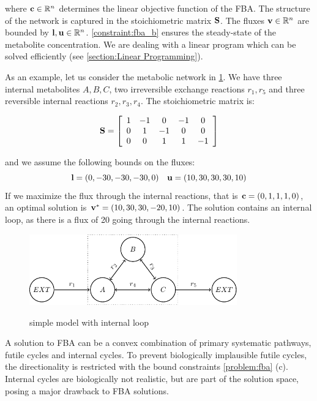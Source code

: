 where $\bold c \in \mathbb{R}^n$ determines the linear objective function of the FBA. The structure of the network is captured in the stoichiometric matrix $\bold S$. The fluxes $\bold v \in \mathbb{R}^n$ are bounded by $\bold l, \bold u \in \mathbb{R}^n$. \cref{constraint:fba_b} ensures the steady-state of the metabolite concentration. We are dealing with a linear program which can be solved efficiently (see \cref{section:Linear Programming}).

As an example, let us consider the metabolic network in \cref{fig:loop}. We have three internal metabolites $A,B,C$, two irreversible exchange reactions $r_1, r_5$ and three reversible internal reactions $r_2, r_3, r_4$. The stoichiometric matrix is: 

\begin{equation} \label{Eq:S_loop}
    \bold S =
    \left[\begin{array}{ccccc}
        1 & -1 & 0 & -1 & 0 \\
        0 & 1 & -1 & 0 & 0 \\
        0 & 0 & 1 & 1 & -1 \\
    \end{array}\right]        
\end{equation}

\quad and we assume the following bounds on the fluxes: 
\begin{equation} \label{Eq:bounds_loop}
    \bold l = (0,-30,-30,-30,0) \quad \bold u = (10,30,30,30,10)
\end{equation}
If we maximize the flux through the internal reactions, that is $\bold c = (0,1,1,1,0)$, an optimal solution is $\bold v^* = (10, 30, 30, -20, 10)$. The solution contains an internal loop, as there is a flux of 20 going through the internal reactions.

\begin{figure}[h!]
    \caption{simple model with internal loop}
    \centering
    \includegraphics[width=0.8\textwidth]{Images/tikz_graphs_one_loop.pdf}
    \label{fig:loop}
\end{figure}

A solution to FBA can be a convex combination of primary systematic pathways, futile cycles and internal cycles. To prevent biologically implausible futile cycles, the directionality is restricted with the bound constraints \cref{problem:fba} (c). Internal cycles are biologically not realistic, but are part of the solution space, posing a major drawback to FBA solutions. 

